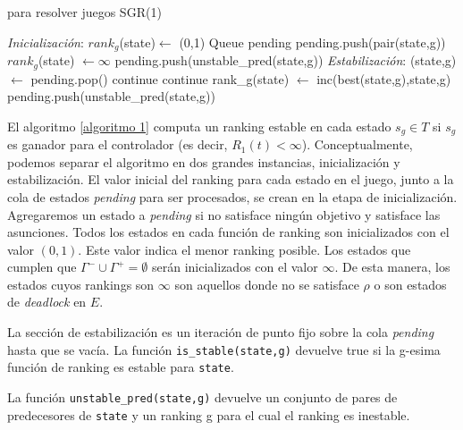 \begin{algorithm}
\caption{para resolver juegos SGR(1)}\label{euclid}
\label{algoritmo 1}
\begin{algorithmic}[1]
\BState \emph{Inicialización}:
        \State $rank_g$(state)$\gets$ (0,1)
    \EndFor
\EndFor
\State Queue pending
        \State pending.push(pair(state,g))
    \EndIf
            \State $rank_g$(state) $\gets \infty$
            \State pending.push(unstable\_pred(state,g))
        \EndFor
    \EndIf
\EndFor
\BState \emph{Estabilización}:
    \State (state,g) $\gets$ pending.pop()
        \State continue
    \EndIf
        \State continue
    \EndIf
    \State rank_g(state) $\gets$ inc(best(state,g),state,g)
    \State pending.push(unstable\_pred(state,g))
\EndWhile
\end{algorithmic}
\end{algorithm}


El algoritmo \ref{algoritmo 1} computa un ranking estable en cada estado $s_g \in T$ si $s_g$ es ganador para el
controlador (es decir, $R_1(t)<\infty$). Conceptualmente, podemos separar el algoritmo en dos grandes instancias,
inicialización y estabilización. El valor inicial del ranking para cada estado en el juego, junto a la cola de
estados \emph{pending} para ser procesados, se crean en la etapa de inicialización. Agregaremos un estado a
\emph{pending} si no satisface ningún objetivo y satisface las asunciones. Todos los estados en cada función de ranking
son inicializados con el valor $(0,1)$. Este valor indica el menor ranking posible. Los estados que cumplen que
$\Gamma^- \cup \Gamma^+ = \emptyset$ serán inicializados con el valor $\infty$. De esta manera, los estados cuyos
rankings son $\infty$ son aquellos donde no se satisface $\rho$ o son estados de \emph{deadlock} en $E$.

La sección de estabilización es un iteración de punto fijo sobre la cola \emph{pending} hasta que se vacía. La función
\texttt{is\_stable(state,g)} devuelve true si la g-esima función de ranking es estable para \texttt{state}.

La función \texttt{unstable\_pred(state,g)} devuelve un conjunto de pares de predecesores de \texttt{state} y un
ranking g para el cual el ranking es inestable.

